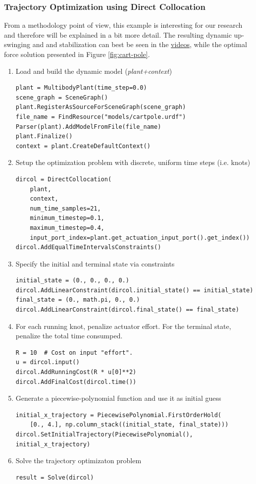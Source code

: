 \subsubsection{Trajectory Optimization using Direct Collocation}
From a methodology point of view, this example is interesting for our research and therefore will be explained in a bit more detail. The resulting dynamic up-swinging and and stabilization can best be seen in the \href{https://raw.githubusercontent.com/julesser/oc-frameworks/master/OCFrameworks/Media/Drake/ExSimple/CartpoleTrajOptDirCol.mp4}{videos}, while the optimal force solution presented in Figure \ref{fig:cart-pole}.
\begin{enumerate}
\item Load and build the dynamic model (\textit{plant+context})
\begin{verbatim}
plant = MultibodyPlant(time_step=0.0)
scene_graph = SceneGraph()
plant.RegisterAsSourceForSceneGraph(scene_graph)
file_name = FindResource("models/cartpole.urdf")
Parser(plant).AddModelFromFile(file_name)
plant.Finalize()
context = plant.CreateDefaultContext()
\end{verbatim}
\item Setup the optimization problem with discrete, uniform time steps (i.e. knots)
\begin{verbatim}
dircol = DirectCollocation(
    plant,
    context,
    num_time_samples=21,
    minimum_timestep=0.1,
    maximum_timestep=0.4,
    input_port_index=plant.get_actuation_input_port().get_index())
dircol.AddEqualTimeIntervalsConstraints()
\end{verbatim}
\item Specify the initial and terminal state via constraints
\begin{verbatim}
initial_state = (0., 0., 0., 0.)
dircol.AddLinearConstraint(dircol.initial_state() == initial_state)
final_state = (0., math.pi, 0., 0.)
dircol.AddLinearConstraint(dircol.final_state() == final_state)
\end{verbatim}
\item For each running knot, penalize actuator effort. For the terminal state, penalize the total time consumped.
\begin{verbatim}
R = 10  # Cost on input "effort".
u = dircol.input()
dircol.AddRunningCost(R * u[0]**2)
dircol.AddFinalCost(dircol.time())
\end{verbatim}
\item Generate a piecewise-polynomial function and use it as initial guess
\begin{verbatim}
initial_x_trajectory = PiecewisePolynomial.FirstOrderHold(
    [0., 4.], np.column_stack((initial_state, final_state)))  
dircol.SetInitialTrajectory(PiecewisePolynomial(), initial_x_trajectory)
\end{verbatim}
\item Solve the trajectory optimizaton problem
\begin{verbatim}
result = Solve(dircol)
\end{verbatim}
\end{enumerate}

